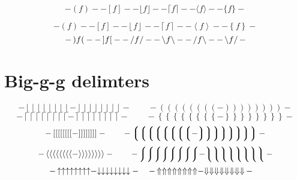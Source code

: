 \documentclass[fleqn]{article}
\begin{document}
\def\testdelim#1#2{ - #1 f #2 - }
\begin{displaymath}
  \testdelim() 
  \testdelim[] 
  \testdelim\lfloor\rfloor 
  \testdelim\lceil\rceil 
  \testdelim\langle\rangle 
  \testdelim\{\} 
\end{displaymath}

\def\testdelim#1#2{ - \left#1 f \right#2 - }
\begin{displaymath}
  \testdelim() 
  \testdelim[] 
  \testdelim\lfloor\rfloor 
  \testdelim\lceil\rceil 
  \testdelim\langle\rangle 
  \testdelim\{\} 
\end{displaymath}
\begin{displaymath}
  \testdelim)(
  \testdelim][
  \testdelim// 
  \testdelim\backslash\backslash
  \testdelim/\backslash 
  \testdelim\backslash/
\end{displaymath}


\clearpage
\section{Big-g-g delimters}

\def\testdelim#1#2{%
  - \left#1\left#1\left#1\left#1\left#1\left#1\left#1\left#1 - 
  \right#2\right#2\right#2\right#2\right#2\right#2\right#2\right#2 -}

\begingroup
\delimitershortfall-1pt
\begin{displaymath}
  \testdelim\lfloor\rfloor 
  \qquad 
  \testdelim()
\end{displaymath}
\begin{displaymath}
  \testdelim\lceil\rceil 
  \qquad 
  \testdelim\{\} 
\end{displaymath}
\begin{displaymath}
  \testdelim[] 
  \qquad 
  \testdelim\lgroup\rgroup
\end{displaymath}
\begin{displaymath}
  \testdelim\langle\rangle
  \qquad 
  \testdelim\lmoustache\rmoustache
\end{displaymath}
\begin{displaymath}
  \testdelim\uparrow\downarrow \quad
  \testdelim\Uparrow\Downarrow \quad
\end{displaymath}
\endgroup %
\end{document}
